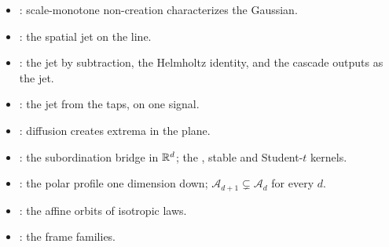 \begin{itemize}
\item {}: scale-monotone non-creation characterizes the
Gaussian.
\item {}: the spatial jet on the line.
\item {}: the \Matern{} jet by subtraction,
the Helmholtz identity, and the cascade outputs as the jet.
\item {}: the jet from the
taps, on one signal.
\item {}: diffusion creates extrema in the plane.
\item {}: the subordination bridge in $\mathbb{R}^d$; the
\Matern{}, stable and Student-$t$ kernels.
\item {}: the polar profile one dimension down;
$\mathcal{A}_{d+1} \subsetneq \mathcal{A}_d$ for every $d$.
\item {}: the affine orbits of isotropic laws.
\item {}: the frame families.
\end{itemize}

